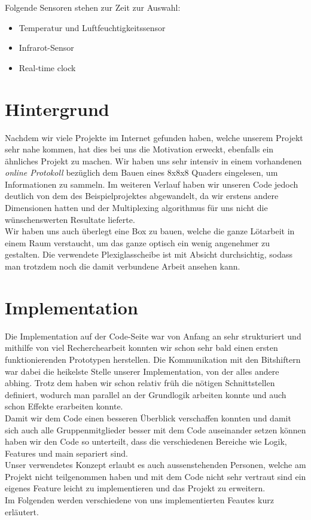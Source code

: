 \documentclass[12pt,a4paper]{article}
\begin{document}
Folgende Sensoren stehen zur Zeit zur Auswahl:
\begin{itemize}
    \item Temperatur und Luftfeuchtigkeitssensor
    \item Infrarot-Sensor
    \item Real-time clock
\end{itemize}


\section{Hintergrund}

Nachdem wir viele Projekte im Internet gefunden haben, welche unserem Projekt sehr nahe kommen, 
hat dies bei uns die Motivation erweckt, ebenfalls ein ähnliches Projekt zu machen.
Wir haben uns sehr intensiv in einem vorhandenen \textit{online Protokoll} bezüglich dem Bauen eines 8x8x8 Quaders eingelesen, um Informationen zu sammeln\cite{RGB LED Cube}. Im weiteren Verlauf haben wir unseren Code jedoch deutlich von dem des Beispielprojektes abgewandelt, da wir erstens andere Dimensionen hatten und der Multiplexing algorithmus für uns nicht die wünschenswerten Resultate lieferte. \\
Wir haben uns auch überlegt eine Box zu bauen, welche die ganze Lötarbeit in einem Raum verstaucht, um das ganze optisch ein wenig angenehmer zu gestalten. Die verwendete Plexiglasscheibe ist mit Absicht durchsichtig, sodass man trotzdem noch die damit verbundene Arbeit ansehen kann.





\section{Implementation}

Die Implementation auf der Code-Seite war von Anfang an sehr strukturiert und mithilfe von viel Recherchearbeit konnten wir schon sehr bald einen ersten funktionierenden Prototypen herstellen. Die Kommunikation mit den Bitshiftern war dabei die heikelste Stelle unserer Implementation, von der alles andere abhing. Trotz dem haben wir schon relativ früh die nötigen Schnittstellen definiert, wodurch man parallel an der Grundlogik arbeiten konnte und auch schon Effekte erarbeiten konnte.\\
Damit wir dem Code einen besseren Überblick verschaffen konnten und damit sich auch alle Gruppenmitglieder besser mit dem Code auseinander setzen können haben wir den Code so unterteilt, dass die verschiedenen Bereiche wie Logik, Features und main separiert sind. \\
Unser verwendetes Konzept erlaubt es auch aussenstehenden Personen, welche am Projekt nicht teilgenommen haben und mit dem Code nicht sehr
vertraut sind ein eigenes Feature leicht zu implementieren und das Projekt zu erweitern\cite{readMeCode}. \\
Im Folgenden werden verschiedene von uns implementierten Feautes kurz erläutert.
\newpage
\end{document}

